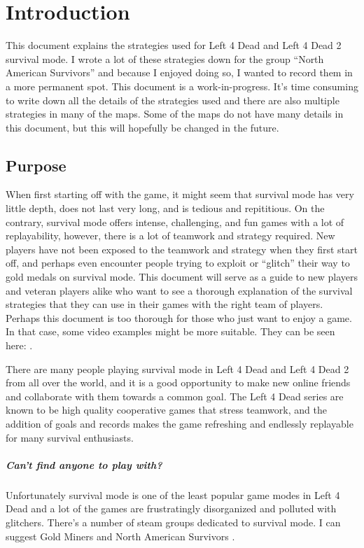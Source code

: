 \chapter{Introduction}
This document explains the strategies used for Left 4 Dead and Left 4 Dead 2 survival mode. I wrote a lot of these strategies down for the group ``North American Survivors'' and because I enjoyed doing so, I wanted to record them in a more permanent spot. This document is a work-in-progress. It's time consuming to write down all the details of the strategies used and there are also multiple strategies in many of the maps. Some of the maps do not have many details in this document, but this will hopefully be changed in the future.

\section{Purpose}
When first starting off with the game, it might seem that survival mode has very little depth, does not last very long, and is tedious and repititious. On the contrary, survival mode offers intense, challenging, and fun games with a lot of replayability, however, there is a lot of teamwork and strategy required. New players have not been exposed to the teamwork and strategy when they first start off, and perhaps even encounter people trying to exploit or ``glitch'' their way to gold medals on survival mode. This document will serve as a guide to new players and veteran players alike who want to see a thorough explanation of the survival strategies that they can use in their games with the right team of players. Perhaps this document is too thorough for those who just want to enjoy a game. In that case, some video examples might be more suitable. They can be seen here: \cite{web:gm_youtube}.

There are many people playing survival mode in Left 4 Dead and Left 4 Dead 2 from all over the world, and it is a good opportunity to make new online friends and collaborate with them towards a common goal. The Left 4 Dead series are known to be high quality cooperative games that stress teamwork, and the addition of goals and records makes the game refreshing and endlessly replayable for many survival enthusiasts.

\paragraph{Can't find anyone to play with?}
Unfortunately survival mode is one of the least popular game modes in Left 4 Dead and a lot of the games are frustratingly disorganized and polluted with glitchers. There's a number of steam groups dedicated to survival mode. I can suggest Gold Miners \cite{web:gm} and North American Survivors \cite{web:nas}.

